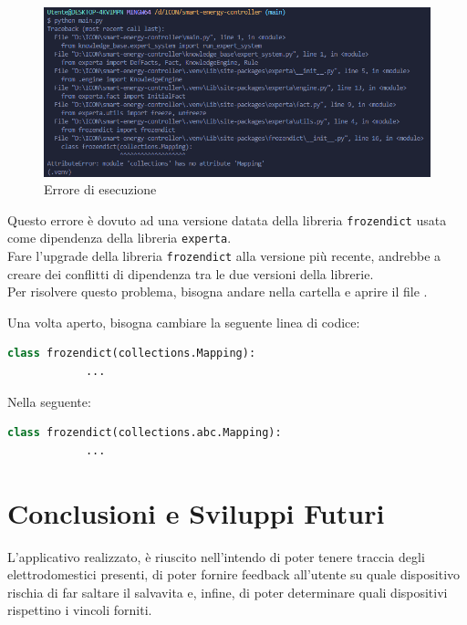 \documentclass[12pt, letterpaper]{article}
\begin{document}
\begin{figure}[h]
      \centering
      \includegraphics[scale=0.55]{errore-python.png}
      \caption{Errore di esecuzione}
\end{figure}

\noindent Questo errore è dovuto ad una versione datata della libreria \texttt{frozendict}
usata come dipendenza della libreria \texttt{experta}. \\

\noindent Fare l'upgrade della libreria \texttt{frozendict} alla versione più recente, andrebbe a
creare dei conflitti di dipendenza tra le due versioni della librerie. \\

\noindent Per risolvere questo problema, bisogna andare nella cartella
 e aprire il file .

\noindent Una volta aperto, bisogna cambiare la seguente linea di codice: \\

\begin{lstlisting}[language=Python]
      class frozendict(collections.Mapping):
            ...
\end{lstlisting}

Nella seguente:

\begin{lstlisting}[language=Python]
      class frozendict(collections.abc.Mapping):
            ...
\end{lstlisting}

\section{Conclusioni e Sviluppi Futuri}

L'applicativo realizzato, è riuscito nell'intendo di poter tenere traccia degli elettrodomestici
presenti, di poter fornire feedback all'utente su quale dispositivo rischia di far saltare il salvavita
e, infine, di poter determinare quali dispositivi rispettino i vincoli forniti. \\
\end{document}
